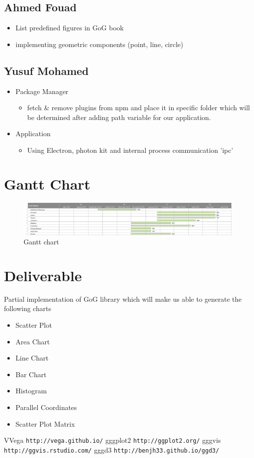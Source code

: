 \documentclass[12pt]{article}
\begin{document}
\subsection{Ahmed Fouad}
\begin{itemize}
\item List predefined figures in GoG book
\item implementing geometric components (point, line, circle)
\end{itemize}
\subsection{Yusuf Mohamed}
\begin{itemize}
\item Package Manager
\begin{itemize}
\item fetch \& remove plugins from npm and place it in specific folder which will be determined after adding path variable for our application.
\end{itemize}
\item Application
\begin{itemize}
\item Using Electron, photon kit and internal process communication 'ipc'

\end{itemize}
\end{itemize}

\section{Gantt Chart}
\begin{figure}[h!]
\caption{Gantt chart}
\includegraphics[width=\textwidth]{gantt}

\end{figure}

\section{Deliverable}
Partial implementation of GoG library which will make us able to generate the following charts
\begin{itemize}
\item Scatter Plot
\item Area Chart
\item Line Chart
\item Bar Chart
\item Histogram
\item Parallel Coordinates
\item Scatter Plot Matrix 
\end{itemize}


\begin{thebibliography}{10}
\bibitem VVega \texttt{http://vega.github.io/}
\bibitem gggplot2 \texttt{http://ggplot2.org/}
\bibitem gggvis \texttt{http://ggvis.rstudio.com/}
\bibitem gggd3 \texttt{http://benjh33.github.io/ggd3/}
\end{thebibliography} 
\end{document}
